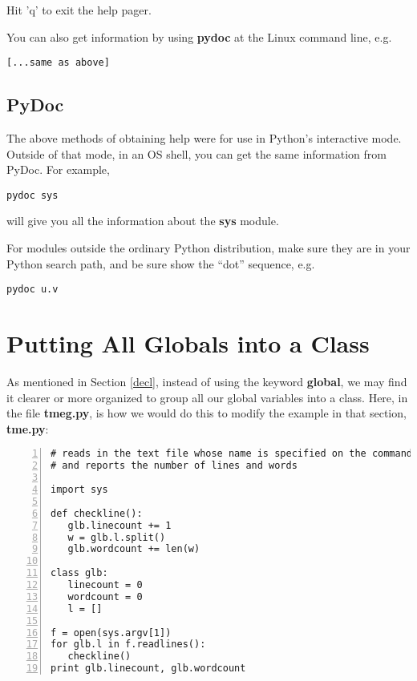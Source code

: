Hit 'q' to exit the help pager.

You can also get information by using {\bf pydoc} at the Linux command
line, e.g.

\begin{Verbatim}[fontsize=\relsize{-2}]
% pydoc string.center
[...same as above]
\end{Verbatim}

\subsection{PyDoc}

The above methods of obtaining help were for use in Python's interactive
mode.  Outside of that mode, in an OS shell, you can get the same
information from PyDoc.  For example,

\begin{Verbatim}[fontsize=\relsize{-2}]
pydoc sys
\end{Verbatim}

will give you all the information about the {\bf sys} module.

For modules outside the ordinary Python distribution, make sure they are
in your Python search path, and be sure show the ``dot'' sequence, e.g.

\begin{Verbatim}[fontsize=\relsize{-2}]
pydoc u.v
\end{Verbatim}

\section{Putting All Globals into a Class}
\label{glbls}

As mentioned in Section \ref{decl}, instead of using the keyword {\bf
global}, we may find it clearer or more organized to group all our 
global variables into a class.  Here, in the file {\bf tmeg.py}, is how
we would do this to modify the example in that section, {\bf tme.py}:

\begin{Verbatim}[fontsize=\relsize{-2},numbers=left]
# reads in the text file whose name is specified on the command line,
# and reports the number of lines and words

import sys

def checkline():
   glb.linecount += 1
   w = glb.l.split()
   glb.wordcount += len(w)

class glb:
   linecount = 0
   wordcount = 0
   l = []

f = open(sys.argv[1])
for glb.l in f.readlines():
   checkline()
print glb.linecount, glb.wordcount
\end{Verbatim}

